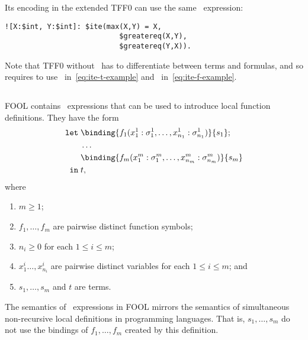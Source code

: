 Its encoding in the extended TFF0 can use the same \dite\ expression:
\begin{lstlisting}
![X:$int, Y:$int]: $ite(max(X,Y) = X,
                           $greatereq(X,Y),
                           $greatereq(Y,X)).
\end{lstlisting}

Note that TFF0 without \dite\ has to differentiate between terms and formulas, and so requires to use \ditet\ in~\eqref{eq:ite-t-example} and \ditef\ in~\eqref{eq:ite-f-example}.

\subsection{\LETIN}

FOOL contains \LETIN\ expressions that can be used to introduce local function definitions. They have the form
\begin{equation}\label{eq:let}
\begin{aligned}
\mathtt{let}\;&\binding{f_1(x^1_1:\sigma^1_1,\ldots,x^1_{n_1}:\sigma^1_{n_1})}{s_1};\\
              &\ldots\\
              &\binding{f_m(x^m_1:\sigma^m_1,\ldots,x^m_{n_m}:\sigma^m_{n_m})}{s_m}\\
 \mathtt{in}\;&t,
\end{aligned}
\end{equation}
where
\begin{enumerate}
  \item $m \geq 1$;
  \item $f_1,\ldots,f_m$ are pairwise distinct function symbols;
  \item $n_i \geq 0$ for each $1 \leq i \leq m$;
  \item $x^i_1\ldots,x^i_{n_i}$ are pairwise distinct variables for each $1 \leq i \leq m$; and
  \item $s_1,\ldots,s_m$ and $t$ are terms.
\end{enumerate}



The semantics of \LETIN\ expressions in FOOL mirrors the semantics of simultaneous non-recursive local definitions in programming languages. That is, $s_1,\ldots,s_m$ do not use the bindings of $f_1,\ldots,f_m$ created by this definition.

